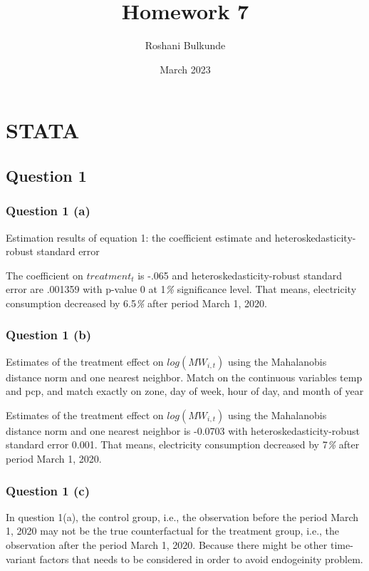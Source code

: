 \documentclass{article}
\title{Homework 7}
\author{Roshani Bulkunde}
\date{March 2023}
\begin{document}
\maketitle

\section{STATA}
\subsection{Question 1 }
\subsubsection{Question 1 (a) }
\begin{table}[ht]
    \centering
    
    \caption{Estimation results of equation 1: the coefficient estimate and heteroskedasticity-robust standard error}
    \label{tab:output1a_stata}
\end{table}
The coefficient on $treatment_t$ is -.065 and heteroskedasticity-robust standard error are .001359 with p-value 0 at 1\textit{\%} significance level. That means, electricity consumption decreased by 6.5\textit{\%} after period March 1, 2020. 

\newpage

\subsubsection{Question 1 (b) }
\begin{table}[ht]
    \centering
    
    \caption{Estimates of the treatment effect on $log(MW_{i,t})$ using the Mahalanobis distance norm and one nearest neighbor. Match on the continuous variables temp and pcp, and match exactly on zone, day of week, hour of day, and month of year}
    \label{tab:output1b_stata}
\end{table}
Estimates of the treatment effect on $log(MW_{i,t})$ using the Mahalanobis distance norm and one nearest neighbor is -0.0703 with heteroskedasticity-robust standard error 0.001. That means, electricity consumption decreased by 7\textit{\%} after period March 1, 2020. 



\subsubsection{Question 1 (c)}
In question 1(a), the control group, i.e., the observation before the period March 1, 2020 may not be the true counterfactual for the treatment group, i.e., the observation after the period March 1, 2020. Because there might be other time-variant factors that needs to be considered in order to avoid endogeinity problem.
\end{document}
